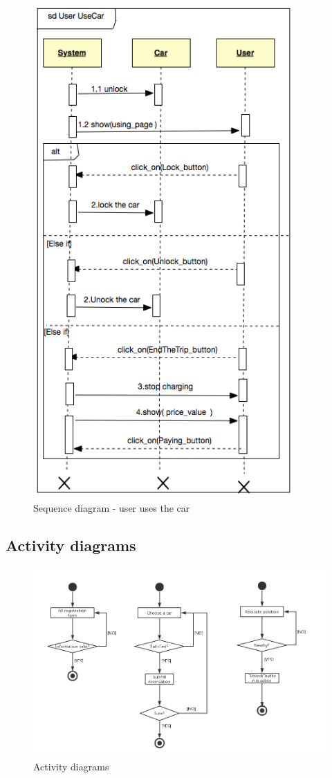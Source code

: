 \documentclass[12pt, letterpaper]{article}
\begin{document}
\begin{figure}[H]
\centering
\includegraphics[width=10cm]{useruse.png}
\caption{Sequence diagram - user uses the car}
\end{figure}

\newpage
\subsection{Activity diagrams}

\begin{figure}[H]
\centering
\includegraphics[width=\textwidth]{activity.png}
\caption{Activity diagrams}
\end{figure}
\end{document}

